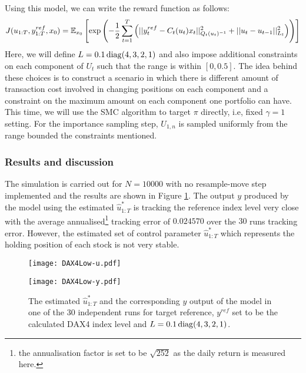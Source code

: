 Using this model, we can write the reward function as follows:
\begin{equation}
  J(u_{1:T},y^{ref}_{1:T}, x_0) = \operatorname{\mathbb{E}}_{x_0}\left[ \exp \left( -\dfrac{1}{2}\displaystyle\sum^T_{t=1}\left(\vert\vert y^{ref}_t - C_t(u_t)x_t \vert\vert^2_{Q_t(u_t)^{-1}}  + \vert\vert u_t - u_{t-1} \vert\vert^2_{L_t}\right) \right ) \right]
\end{equation}
Here, we will define $L = 0.1\operatorname{diag}(4,3,2,1)$  and also impose additional constraints on each component of $U_t$ such that the range is within $[0,0.5]$. The idea behind these choices is to construct a scenario in which there is different amount of transaction cost involved in changing positions on each component and a constraint on the maximum amount on each component one portfolio can have. This time, we will use the SMC algorithm to target $\pi$ directly, i.e, fixed $\gamma=1$ setting. For the importance sampling step, $U_{1,n}$ is sampled uniformly from the range bounded the constraints mentioned. 

\subsubsection{Results and discussion}
The simulation is carried out for $N=10000$ with no resample-move step implemented and the results are shown in Figure \ref{fig:dax4}. The output $y$ produced by the model using the estimated $\hat{u}^*_{1:T}$ is tracking the reference index level very close with the average annualised\footnote{the annualisation factor is set to be $\sqrt{252}$ as the daily return is measured here.} tracking error of $0.024570$ over the $30$ runs tracking error. However, the estimated set of control parameter $\hat{u}^*_{1:T}$ which represents the holding position of each stock is not very stable.

\begin{figure}[tbp]
\centering
    \begin{minipage}{0.5\textwidth}
        \centering
        \texttt{[image: DAX4Low-u.pdf]}
    \end{minipage}%
    \begin{minipage}{0.5\textwidth}
        \centering
        \texttt{[image: DAX4Low-y.pdf]}
    \end{minipage}
\caption{The estimated $\hat{u}^*_{1:T}$ and the corresponding $y$ output of the model in one of the 30 independent runs for target reference, $y^{ref}$ set to be the calculated DAX4 index level and $L = 0.1\operatorname{diag}(4,3,2,1)$.}
\label{fig:dax4}
\end{figure}

